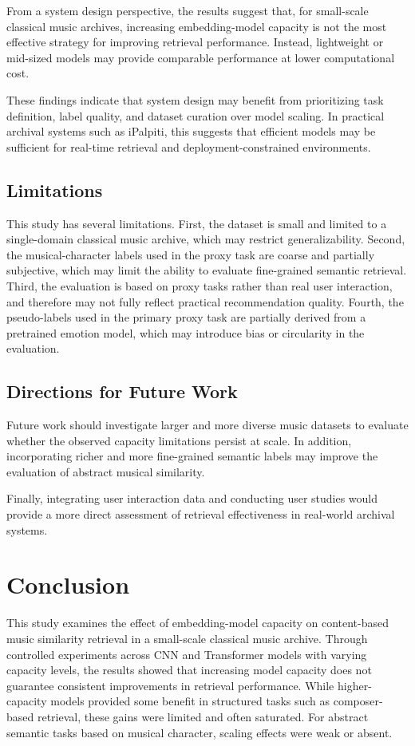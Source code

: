 \documentclass{article}
\begin{document}
From a system design perspective, the results suggest that, for small-scale classical music archives, increasing embedding-model capacity is not the most effective strategy for improving retrieval performance.
Instead, lightweight or mid-sized models may provide comparable performance at lower computational cost.

These findings indicate that system design may benefit from prioritizing task definition, label quality, and dataset curation over model scaling.
In practical archival systems such as iPalpiti, this suggests that efficient models may be sufficient for real-time retrieval and deployment-constrained environments.

\subsection{Limitations}

This study has several limitations.
First, the dataset is small and limited to a single-domain classical music archive, which may restrict generalizability.
Second, the musical-character labels used in the proxy task are coarse and partially subjective, which may limit the ability to evaluate fine-grained semantic retrieval.
Third, the evaluation is based on proxy tasks rather than real user interaction, and therefore may not fully reflect practical recommendation quality.
Fourth, the pseudo-labels used in the primary proxy task are partially derived from a pretrained emotion model, which may introduce bias or circularity in the evaluation.

\subsection{Directions for Future Work}

Future work should investigate larger and more diverse music datasets to evaluate whether the observed capacity limitations persist at scale.
In addition, incorporating richer and more fine-grained semantic labels may improve the evaluation of abstract musical similarity.

Finally, integrating user interaction data and conducting user studies would provide a more direct assessment of retrieval effectiveness in real-world archival systems.



\section{Conclusion}
This study examines the effect of embedding-model capacity on content-based music similarity retrieval in a small-scale classical music archive.
Through controlled experiments across CNN and Transformer models with varying capacity levels, the results showed that increasing model capacity does not guarantee consistent improvements in retrieval performance. While higher-capacity models provided some benefit in structured tasks such as composer-based retrieval, these gains were limited and often saturated. 
For abstract semantic tasks based on musical character, scaling effects were weak or absent.
\end{document}
